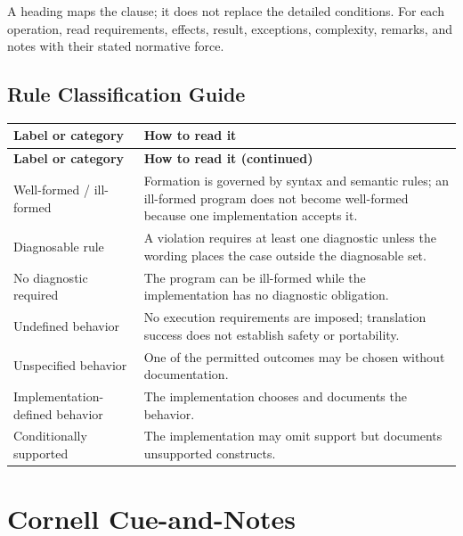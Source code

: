 \documentclass[11pt,letterpaper]{article}
\begin{document}
\begin{CornellReferenceNormativeBox}A heading maps the clause; it does not replace the detailed conditions. For each operation, read requirements, effects, result, exceptions, complexity, remarks, and notes with their stated normative force.\end{CornellReferenceNormativeBox}
\subsection*{Rule Classification Guide}
\small\begin{longtable}{@{}>{\RaggedRight\arraybackslash}p{}>{\RaggedRight\arraybackslash}p{}@{}}\toprule\textbf{Label or category} & \textbf{How to read it}\\\midrule\endfirsthead\toprule\textbf{Label or category} & \textbf{How to read it (continued)}\\\midrule\endhead\bottomrule\endfoot
Well-formed / ill-formed & Formation is governed by syntax and semantic rules; an ill-formed program does not become well-formed because one implementation accepts it.\\
Diagnosable rule & A violation requires at least one diagnostic unless the wording places the case outside the diagnosable set.\\
No diagnostic required & The program can be ill-formed while the implementation has no diagnostic obligation.\\
Undefined behavior & No execution requirements are imposed; translation success does not establish safety or portability.\\
Unspecified behavior & One of the permitted outcomes may be chosen without documentation.\\
Implementation-defined behavior & The implementation chooses and documents the behavior.\\
Conditionally supported & The implementation may omit support but documents unsupported constructs.\\
\end{longtable}\normalsize
\section{Cornell Cue-and-Notes}
\end{document}
